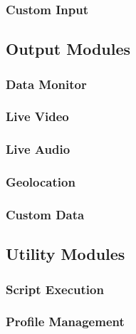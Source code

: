 \subsubsection{Custom Input}
\subsection{Output Modules}
\subsubsection{Data Monitor}
\subsubsection{Live Video}
\subsubsection{Live Audio}
\subsubsection{Geolocation}
\subsubsection{Custom Data}
\subsection{Utility Modules}
\subsubsection{Script Execution}
\subsubsection{Profile Management}